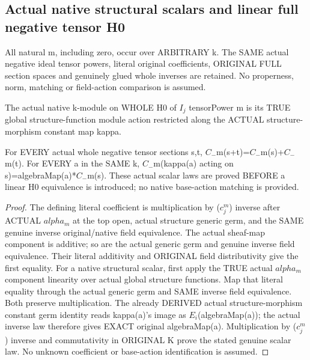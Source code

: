 \subsection{Actual native structural scalars and linear full negative tensor H0}
All natural m, including zero, occur over ARBITRARY k. The SAME actual
negative ideal tensor powers, literal original coefficients, ORIGINAL
FULL section spaces and genuinely glued whole inverses are retained.
No properness, norm, matching or field-action comparison is assumed.

\begin{definition}
\label{def:seven-native-negative-tensor-actual-base-action}
\leanok
The actual native k-module on WHOLE H0 of $I_j$ tensorPower m is its
TRUE global structure-function module action restricted along the
ACTUAL structure-morphism constant map kappa.
\end{definition}

\begin{theorem}
\label{thm:seven-native-negative-tensor-actual-scalar-laws}
\leanok
For EVERY actual whole negative tensor sections s,t,
$C_-$m(s+t)=$C_-$m(s)+$C_-$m(t). For EVERY a in the SAME k,
$C_-$m(kappa(a) acting on s)=algebraMap(a)*$C_-$m(s).
These actual scalar laws are proved BEFORE a linear H0 equivalence
is introduced; no native base-action matching is provided.
\end{theorem}
\begin{proof}
The defining literal coefficient is multiplication by ($c_j^m$) inverse
after ACTUAL $alpha_m$ at the top open, actual structure generic germ,
and the SAME genuine inverse original/native field equivalence.
The actual sheaf-map component is additive; so are the actual generic
germ and genuine inverse field equivalence. Their literal additivity
and ORIGINAL field distributivity give the first equality.
For a native structural scalar, first apply the TRUE actual $alpha_m$
component linearity over actual global structure functions. Map that
literal equality through the actual generic germ and SAME inverse
field equivalence. Both preserve multiplication. The already DERIVED
actual structure-morphism constant germ identity reads kappa(a)'s
image as $E_i$(algebraMap(a)); the actual inverse law therefore gives
EXACT original algebraMap(a). Multiplication by ($c_j^m$) inverse and
commutativity in ORIGINAL K prove the stated genuine scalar law.
No unknown coefficient or base-action identification is assumed.
\end{proof}


